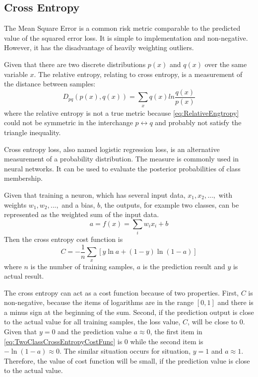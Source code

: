 \subsection{Cross Entropy}

The Mean Square Error is a common risk metric comparable to the predicted value of the squared error loss. It is simple to implementation and non-negative. However, it has the disadvantage of heavily weighting outliers\citep{bermejo2001oriented}.

Given that there are two discrete distributions $p(x)$ and $q(x)$ over the same variable $x$. The relative entropy, relating to cross entropy, is a measurement of the distance between samples:
\begin{equation}\label{eq:RelativeEngtropy}
D_{pq}(p(x), q(x)) = \sum_{\substack{x}}q(x)ln\frac{q(x)}{p(x)}
\end{equation}
where the relative entropy is not a true metric because \ref{eq:RelativeEngtropy} could not be symmetric in the interchange $p \leftrightarrow q$ and probably not satisfy the triangle inequality.

Cross entropy loss, also named logistic regression loss, is an alternative measurement of a probability distribution. The measure is commonly used in neural networks. It can be used to evaluate the posterior probabilities of class membership.

Given that training a neuron, which has several input data, $x_{1}, x_{2},...,$ with weights $w_{1}, w_{2},...,$ and a bias, $b$, the outputs, for example two classes, can be represented as the weighted sum of the input data.
\begin{equation}\label{eq:EquationNN}
a = f(x) = \sum_{i}w_{i}x_{i} + b
\end{equation}
Then the cross entropy cost function is
\begin{equation}\label{eq:TwoClassCrossEntropyCostFunc}
C = -\frac{1}{n} \sum_x \left[y \ln a + (1-y ) \ln (1-a) \right]
\end{equation}
where $n$ is the number of training samples, $a$ is the prediction result and $y$ is actual result.

The cross entropy can act as a cost function because of two properties. First, $C$ is non-negative, because the items of logarithms are in the range $[0,1]$ and there is a minus sign at the beginning of the sum. Second, if the prediction output is close to the actual value for all training samples, the loss value, $C$, will be close to $0$. Given that $y = 0$ and the prediction value $a \approx 0$, the first item in \ref{eq:TwoClassCrossEntropyCostFunc} is $0$ while the second item is $-\ln(1-a) \approx 0$. The similar situation occurs for situation, $y = 1$ and $a \approx 1$. Therefore, the value of cost function will be small, if the prediction value is close to the actual value.

